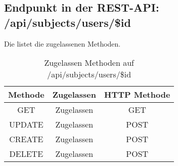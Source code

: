 \subsection{Endpunkt in der REST-API: /api/subjects/users/\$id}
Die  listet die zugelassenen Methoden. 

\begin{table}[!htbp]
	\begin{tabular}{|c|c|c|}
		\hline
			\textbf{Methode} & \textbf{Zugelassen} & \textbf{HTTP Methode} \\ \hline
			GET & Zugelassen & GET \\ \hline
			UPDATE & Zugelassen & POST \\ \hline 
			CREATE & Zugelassen & POST \\ \hline 
			DELETE & Zugelassen & POST \\ \hline
	\end{tabular}

		\caption{Zugelassen Methoden auf /api/subjects/users/\$id}
		\label{tab:end:rest:api:subjects:users:id:meth}
\end{table}